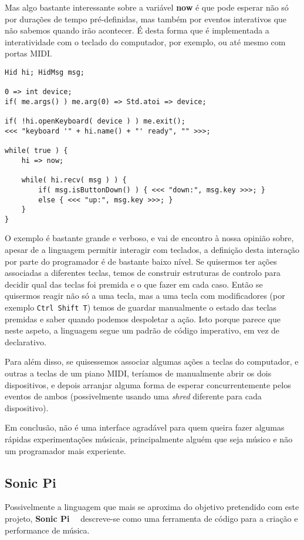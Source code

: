 Mas algo bastante interessante sobre a variável \textbf{now} é que pode esperar não só por durações de tempo pré-definidas, mas também por eventos interativos que não sabemos quando irão acontecer. É desta forma que é implementada a interatividade com o teclado do computador, por exemplo, ou até mesmo com portas MIDI.

\begin{lstlisting}[caption={Exemplos de instruções de avanço no tempo},label={lst:chuck-5}]
Hid hi; HidMsg msg;

0 => int device;
if( me.args() ) me.arg(0) => Std.atoi => device;

if( !hi.openKeyboard( device ) ) me.exit();
<<< "keyboard '" + hi.name() + "' ready", "" >>>;

while( true ) {
    hi => now;

    while( hi.recv( msg ) ) {
        if( msg.isButtonDown() ) { <<< "down:", msg.key >>>; } 
        else { <<< "up:", msg.key >>>; }
    }
}
\end{lstlisting}

O exemplo é bastante grande e verboso, e vai de encontro à nossa opinião sobre, apesar de a linguagem permitir interagir com teclados, a definição desta interação por parte do programador é de bastante baixo nível. Se quisermos ter ações associadas a diferentes teclas, temos de construir estruturas de controlo para decidir qual das teclas foi premida e o que fazer em cada caso. Então se quisermos reagir não só a uma tecla, mas a uma tecla com modificadores (por exemplo \texttt{Ctrl Shift T}) temos de guardar manualmente o estado das teclas premidas e saber quando podemos despoletar a ação. Isto porque parece que neste aspeto, a linguagem segue um padrão de código imperativo, em vez de declarativo.

Para além disso, se quisessemos associar algumas ações a teclas do computador, e outras a teclas de um piano MIDI, teríamos de manualmente abrir os dois dispositivos, e depois arranjar alguma forma de esperar concurrentemente pelos eventos de ambos (possivelmente usando uma \textit{shred} diferente para cada dispositivo).

Em conclusão, não é uma interface agradável para quem queira fazer algumas rápidas experimentações músicais, principalmente alguém que seja músico e não um programador mais experiente.

\subsection{Sonic Pi}
Possivelmente a linguagem que mais se aproxima do objetivo pretendido com este projeto, \textbf{Sonic Pi}~\cite{doi:SonicPi}~\cite{sonic-pi} descreve-se como uma ferramenta de código para a criação e performance de música.

